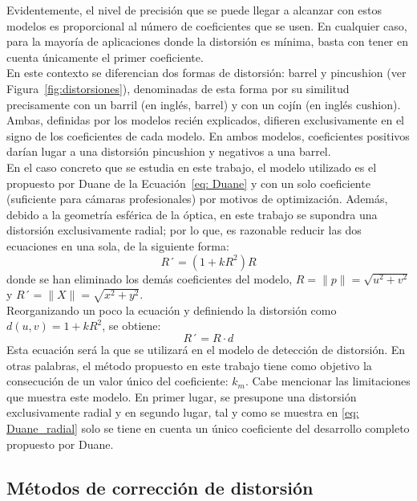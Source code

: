 \documentclass[12pt]{article}
\numberwithin{equation}{section}%
\newcommand{\lightit}[1]{{\lightitfont #1}}
\begin{document}
\newpage
Evidentemente, el nivel de precisión que se puede llegar a alcanzar con estos modelos es proporcional al número de coeficientes que se usen. En cualquier caso, para la mayoría de aplicaciones donde la distorsión es mínima, basta con tener en cuenta únicamente el primer coeficiente.\\

En este contexto se diferencian dos formas de distorsión: \lightit{barrel} y \lightit{pincushion} (ver Figura\ \ref{fig:distorsiones}), denominadas de esta forma por su similitud precisamente con un barril (en inglés, \lightit{barrel}) y con un cojín (en inglés \lightit{cushion}). Ambas, definidas por los modelos recién explicados, difieren exclusivamente en el signo de los coeficientes de cada modelo. En ambos modelos, coeficientes positivos darían lugar a una distorsión \lightit{pincushion} y negativos a una \lightit{barrel}.\\

En el caso concreto que se estudia en este trabajo, el modelo utilizado es el propuesto por Duane de la Ecuación\ \eqref{eq: Duane} y con un solo coeficiente (suficiente para cámaras profesionales) por motivos de optimización. Además, debido a la geometría esférica de la óptica, en este trabajo se supondra una distorsión exclusivamente radial; por lo que, es razonable reducir las dos ecuaciones en una sola, de la siguiente forma:
\begin{equation}
R´ = (1 + k R^2 ) R
\label{eq: Duane_radial}
\end{equation}
donde se han eliminado los demás coeficientes del modelo, \(R=\|p\|=\sqrt{u^2+v^2}\) y \(R´=\|X\|=\sqrt{x^2+y^2}\).\\

Reorganizando un poco la ecuación y definiendo la distorsión como \(d(u, v)=1+kR^2\), se obtiene:
\begin{equation}
    \label{eq:distorsion}
    R´=R\cdot d
\end{equation}
Esta ecuación será la que se utilizará en el modelo de detección de distorsión. En otras palabras, el método propuesto en este trabajo tiene como objetivo la consecución de un valor único del coeficiente: \(k_m\). Cabe mencionar las limitaciones que muestra este modelo. En primer lugar, se presupone una distorsión exclusivamente radial y en segundo lugar, tal y como se muestra en \eqref{eq: Duane_radial} solo se tiene en cuenta un único coeficiente del desarrollo completo propuesto por Duane.

\subsection{Métodos de corrección de distorsión}
\label{subsec:metodos-correccion}
\end{document}

